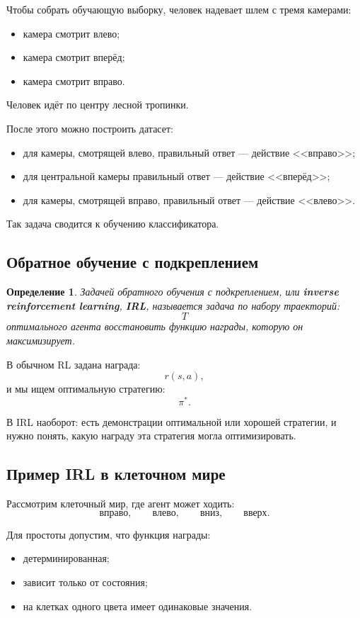 \documentclass[12pt,a4paper]{article}
\newtheorem{definition}{Определение}
\begin{document}
Чтобы собрать обучающую выборку, человек надевает шлем с тремя камерами:
\begin{itemize}
    \item камера смотрит влево;
    \item камера смотрит вперёд;
    \item камера смотрит вправо.
\end{itemize}

Человек идёт по центру лесной тропинки.

После этого можно построить датасет:
\begin{itemize}
    \item для камеры, смотрящей влево, правильный ответ --- действие <<вправо>>;
    \item для центральной камеры правильный ответ --- действие <<вперёд>>;
    \item для камеры, смотрящей вправо, правильный ответ --- действие <<влево>>.
\end{itemize}

Так задача сводится к обучению классификатора.

\subsection{Обратное обучение с подкреплением}

\begin{definition}
Задачей обратного обучения с подкреплением, или \textbf{inverse reinforcement learning}, \textbf{IRL}, называется задача по набору траекторий:
\[
T
\]
оптимального агента восстановить функцию награды, которую он максимизирует.
\end{definition}

В обычном RL задана награда:
\[
r(s,a),
\]
и мы ищем оптимальную стратегию:
\[
\pi^\ast.
\]

В IRL наоборот: есть демонстрации оптимальной или хорошей стратегии, и нужно понять, какую награду эта стратегия могла оптимизировать.

\subsection{Пример IRL в клеточном мире}

Рассмотрим клеточный мир, где агент может ходить:
\[
\text{вправо},
\qquad
\text{влево},
\qquad
\text{вниз},
\qquad
\text{вверх}.
\]

Для простоты допустим, что функция награды:
\begin{itemize}
    \item детерминированная;
    \item зависит только от состояния;
    \item на клетках одного цвета имеет одинаковые значения.
\end{itemize}
\end{document}
